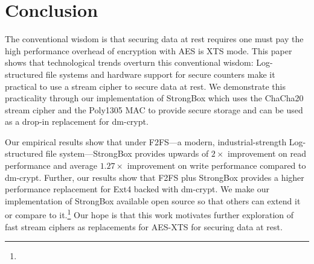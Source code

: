 \section{Conclusion} \label{sec:conclusion}

The conventional wisdom is that securing data at rest requires one must pay the
high performance overhead of encryption with AES is XTS mode. This paper shows
that technological trends overturn this conventional wisdom: Log-structured file
systems and hardware support for secure counters make it practical to use a
stream cipher to secure data at rest. We demonstrate this practicality through
our implementation of StrongBox which uses the ChaCha20 stream cipher and the
Poly1305 MAC to provide secure storage and can be used as a drop-in replacement
for dm-crypt.

Our empirical results show that under F2FS---a modern, industrial-strength
Log-structured file system---StrongBox provides upwards of $2\times$ improvement
on read performance and average $1.27\times$ improvement on write performance
compared to dm-crypt. Further, our results show that F2FS plus StrongBox
provides a higher performance replacement for Ext4 backed with dm-crypt. We make
our implementation of StrongBox available open source so that others can extend
it or compare to it.\footnote{\StrongBoxURI} Our hope is that this work
motivates further exploration of fast stream ciphers as replacements for AES-XTS
for securing data at rest.
